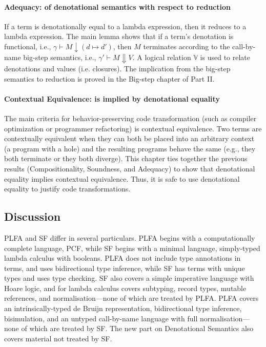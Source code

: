 \documentclass[preprint,authoryear]{elsarticle}
\begin{document}
\paragraph{Adequacy: of denotational semantics with respect to reduction}
If a term is denotationally equal to a lambda expression, then it
reduces to a lambda expression. The main lemma shows that if a term's
denotation is functional, i.e., $\gamma \vdash M \downarrow (d \mapsto
d')$, then $M$ terminates according to the call-by-name big-step
semantics, i.e., $\gamma' \vdash M \Downarrow V$. A logical relation
$\mathbb{V}$ is used to relate denotations and values (i.e. closures).
The implication from the big-step semantics to reduction is proved in
the Big-step chapter of Part II.

\paragraph{Contextual Equivalence: is implied by denotational equality}
The main criteria for behavior-preserving code transformation (such as
compiler optimization or programmer refactoring) is contextual
equivalence. Two terms are contextually equivalent when they can both
be placed into an arbitrary context (a program with a hole) and the
resulting programs behave the same (e.g., they both terminate or they
both diverge). This chapter ties together the previous results
(Compositionality, Soundness, and Adequacy) to show that denotational
equality implies contextual equivalence. Thus, it is safe to use
denotational equality to justify code transformations.


\subsection*{Discussion}

PLFA and SF differ in several particulars.  PLFA begins with a computationally
complete language, PCF, while SF begins with a minimal language, simply-typed
lambda calculus with booleans.  PLFA does not include type annotations in terms,
and uses bidirectional type inference, while SF has terms with unique types and
uses type checking.  SF also covers a simple imperative language with Hoare
logic, and for lambda calculus covers subtyping, record types, mutable
references, and normalisation---none of which are treated by PLFA.  PLFA covers
an intrinsically-typed de Bruijn representation, bidirectional type inference,
bisimulation, and an untyped call-by-name language with full
normalisation---none of which are treated by SF.  The new part on
Denotational Semantics also covers material not treated by SF.
\end{document}
